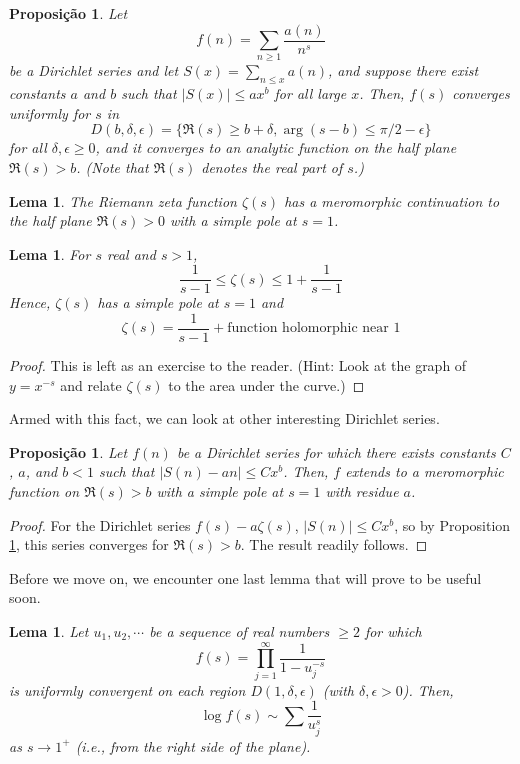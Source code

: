 \documentclass{article}
\theoremstyle{plain}
\newtheorem{prop}[thm]{Proposição}
\newtheorem{lemma}[thm]{Lema}
\theoremstyle{definition}
\theoremstyle{remark}
\numberwithin{equation}{section}
\numberwithin{thm}{section}
\begin{document}
\begin{prop} \label{2.1}
Let $$f(n) = \sum_{n \ge 1} \frac{a(n)}{n^s}$$ be a Dirichlet series and let $S(x) = \sum_{n \le x} a(n)$, and suppose there exist constants $a$ and $b$ such that $|S(x)| \le ax^b$ for all large $x$. Then, $f(s)$ converges uniformly for $s$ in $$D(b, \delta, \epsilon) = \{\Re(s) \ge b + \delta, \arg(s-b) \le \pi/2 - \epsilon\}$$ for all $\delta, \epsilon \ge 0$, and it converges to an analytic function on the half plane $\Re(s) > b$. (Note that $\Re(s)$ denotes the real part of $s$.)
\end{prop}

\begin{lemma}
The Riemann zeta function $\zeta(s)$ has a meromorphic continuation to the half plane $\Re(s) > 0$ with a simple pole at $s = 1$.
\end{lemma}

\begin{lemma}
For $s$ real and $s > 1$, $$\frac{1}{s-1} \le \zeta(s) \le 1 + \frac{1}{s-1}$$ Hence, $\zeta(s)$ has a simple pole at $s = 1$ and $$\zeta(s) = \frac{1}{s-1} + \text{function holomorphic near } 1$$
\end{lemma}

\begin{proof}
This is left as an exercise to the reader. (Hint: Look at the graph of $y = x^{-s}$ and relate $\zeta(s)$ to the area under the curve.)
\end{proof}

Armed with this fact, we can look at other interesting Dirichlet series. 

\begin{prop}
Let $f(n)$ be a Dirichlet series for which there exists constants $C$, $a$, and $b < 1$ such that $|S(n) - an| \le Cx^b$. Then, $f$ extends to a meromorphic function on $\Re(s) > b$ with a simple pole at $s = 1$ with residue $a$. 
\end{prop}

\begin{proof}
For the Dirichlet series $f(s) - a\zeta(s)$, $|S(n)| \le Cx^b$, so by Proposition \ref{2.1}, this series converges for $\Re(s) > b$. The result readily follows.  
\end{proof}

Before we move on, we encounter one last lemma that will prove to be useful soon.

\begin{lemma} \label{2.5}
Let $u_1, u_2, \cdots$ be a sequence of real numbers $\ge 2$ for which $$f(s) = \prod_{j = 1}^{\infty} \frac{1}{1 - u_{j}^{-s}}$$ is uniformly convergent on each region $D(1, \delta, \epsilon)$ (with $\delta, \epsilon > 0$). Then, $$\log f(s) \sim \sum \frac{1}{u_{j}^{s}}$$ as $s \to 1^{+}$ (i.e., from the right side of the plane). 
\end{lemma}
\end{document}
